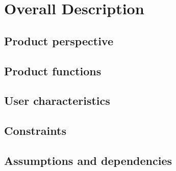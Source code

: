 \chapter{Overall Description}

\section{Product perspective}
\section{Product functions}
\section{User characteristics}
\section{Constraints}
\section{Assumptions and dependencies}